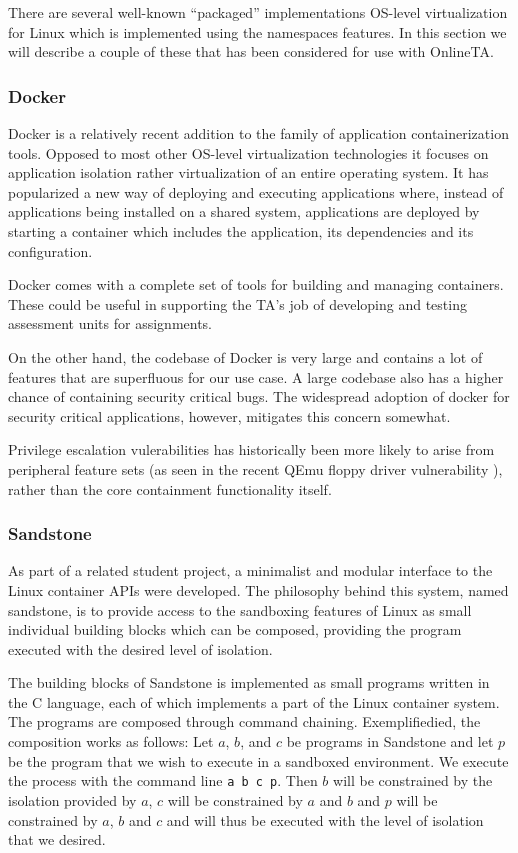 There are several well-known "`packaged"' implementations OS-level
virtualization for Linux which is implemented using the namespaces
features. In this section we will describe a couple of these that has
been considered for use with OnlineTA.

\subsubsection{Docker}
Docker is a relatively recent addition to the family of application
containerization tools. Opposed to most other OS-level virtualization
technologies it focuses on application isolation rather
virtualization of an entire operating system. It has popularized a new
way of deploying and executing applications where, instead of
applications being installed on a shared system, applications are
deployed by starting a container which includes the application, its
dependencies and its configuration. \cite{whatisdocker}

Docker comes with a complete set of tools for building and managing
containers. These could be useful in supporting the TA's job of
developing and testing assessment units for assignments.

On the other hand, the codebase of Docker is very large and
contains a lot of features that are superfluous for our use
case. A large codebase also has a higher chance of containing security
critical bugs. The widespread adoption of docker for security critical
applications, however, mitigates this concern somewhat.

Privilege escalation vulerabilities has historically been more likely
to arise from peripheral feature sets (as seen in the recent QEmu
floppy driver vulnerability \cite{venom}), rather than the core containment
functionality itself.



\subsubsection{Sandstone}
As part of a related student project, a minimalist and modular
interface to the Linux container APIs were developed. The philosophy
behind this system, named sandstone, is to provide access to
the sandboxing features of Linux as small individual building blocks
which can be composed, providing the program executed with the
desired level of isolation.

The building blocks of Sandstone is implemented as small programs
written in the C language, each of which implements a part of the
Linux container system. The programs are composed through command
chaining. Exemplifiedied, the composition works as follows: Let $a$,
$b$, and $c$ be programs in Sandstone and let $p$ be the program that
we wish to execute in a sandboxed environment. We execute the process
with the command line \texttt{a b c p}. Then $b$ will be constrained
by the isolation provided by $a$, $c$ will be constrained by $a$ and
$b$ and $p$ will be constrained by $a$, $b$ and $c$ and will thus be
executed with the level of isolation that we desired. \cite{onlineta}

